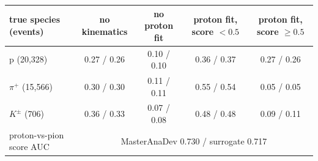 \begin{tabular}{lcccc}
\toprule
true species (events) & no kinematics & no proton fit & proton fit, score $<0.5$ & proton fit, score $\geq 0.5$ \\
\midrule
p (20,328) & 0.27 / 0.26 & 0.10 / 0.10 & 0.36 / 0.37 & 0.27 / 0.26 \\
$\pi^+$ (15,566) & 0.30 / 0.30 & 0.11 / 0.11 & 0.55 / 0.54 & 0.05 / 0.05 \\
$K^\pm$ (706) & 0.36 / 0.33 & 0.07 / 0.08 & 0.48 / 0.48 & 0.09 / 0.11 \\
\midrule
proton-vs-pion score AUC & \multicolumn{4}{c}{MasterAnaDev 0.730 / surrogate 0.717} \\
\bottomrule
\end{tabular}
